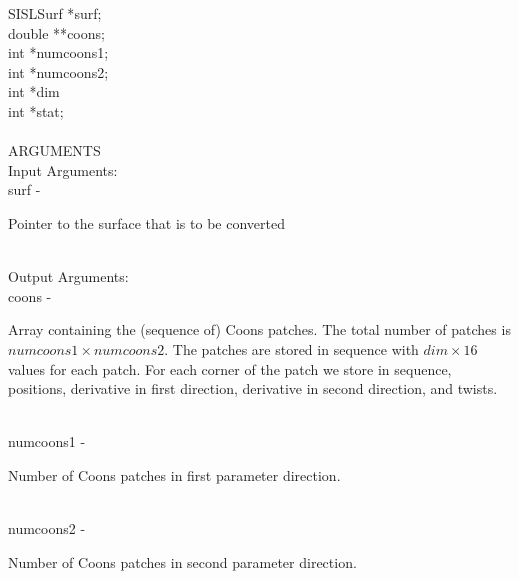                 \>\>    SISLSurf        \>      *{\fov surf};\\
                \>\>    double  \>      **{\fov coons};\\
                \>\>    int     \>      *{\fov numcoons1};\\
                \>\>    int     \>      *{\fov numcoons2};\\
                \>\>    int     \>      *{\fov dim}\\
                \>\>    int     \>      *{\fov stat};\\
\\
ARGUMENTS\\
        \>Input Arguments:\\
        \>\>    {\fov surf}     \> - \> \begin{minipg2}
                                Pointer to the surface that is to be converted
                                \end{minipg2}\\[0.8ex]
        \>Output Arguments:\\
        \>\>    {\fov coons}    \> - \> \begin{minipg2}
                                Array containing the (sequence of) Coons patches.
                                The total number of patches is
                                $numcoons1\times numcoons2$. The patches
                                are stored in sequence with $dim\times
                                16$ values for each patch. For each
                                corner of the patch we store in
                                sequence, positions, derivative in first
                                direction, derivative in second
                                direction, and twists.
                                \end{minipg2}\\[0.3ex]
        \>\>    {\fov numcoons1}\> - \> \begin{minipg2}
                                Number of Coons patches in first
                                parameter direction.
                                \end{minipg2}\\[0.3ex]
        \>\>    {\fov numcoons2}\> - \> \begin{minipg2}
                                Number of Coons patches in second
                                parameter direction.
                                \end{minipg2}\\[0.3ex]

